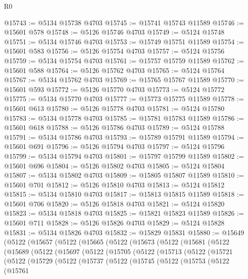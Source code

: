\begin{lexlean}{R0}
\begin{coremodule}
@15743 := @5134 @15738 @4703
@15745 := @15741 @15743 @11589
@15746 := @15601 @578
@15748 := @5126 @15746 @4703
@15749 := @5124 @15748
@15751 := @5134 @15746 @4703
@15753 := @15749 @15751 @11589
@15754 := @15601 @583
@15756 := @5126 @15754 @4703
@15757 := @5124 @15756
@15759 := @5134 @15754 @4703
@15761 := @15757 @15759 @11589
@15762 := @15601 @588
@15764 := @5126 @15762 @4703
@15765 := @5124 @15764
@15767 := @5134 @15762 @4703
@15769 := @15765 @15767 @11589
@15770 := @15601 @593
@15772 := @5126 @15770 @4703
@15773 := @5124 @15772
@15775 := @5134 @15770 @4703
@15777 := @15773 @15775 @11589
@15778 := @15601 @613
@15780 := @5126 @15778 @4703
@15781 := @5124 @15780
@15783 := @5134 @15778 @4703
@15785 := @15781 @15783 @11589
@15786 := @15601 @618
@15788 := @5126 @15786 @4703
@15789 := @5124 @15788
@15791 := @5134 @15786 @4703
@15793 := @15789 @15791 @11589
@15794 := @15601 @691
@15796 := @5126 @15794 @4703
@15797 := @5124 @15796
@15799 := @5134 @15794 @4703
@15801 := @15797 @15799 @11589
@15802 := @15601 @696
@15804 := @5126 @15802 @4703
@15805 := @5124 @15804
@15807 := @5134 @15802 @4703
@15809 := @15805 @15807 @11589
@15810 := @15601 @701
@15812 := @5126 @15810 @4703
@15813 := @5124 @15812
@15815 := @5134 @15810 @4703
@15817 := @15813 @15815 @11589
@15818 := @15601 @706
@15820 := @5126 @15818 @4703
@15821 := @5124 @15820
@15823 := @5134 @15818 @4703
@15825 := @15821 @15823 @11589
@15826 := @15601 @711
@15828 := @5126 @15826 @4703
@15829 := @5124 @15828
@15831 := @5134 @15826 @4703
@15832 := @15829 @15831
@15880 := @15649
    (@5122
      (@15657
        (@5122
          (@15665
            (@5122
              (@15673
                (@5122
                  (@15681
                    (@5122
                      (@15689
                        (@5122
                          (@15697
                            (@5122
                              (@15705
                                (@5122
                                  (@15713
                                    (@5122
                                      (@15721
                                        (@5122
                                          (@15729
                                            (@5122
                                              (@15737
                                                (@5122
                                                  (@15745
                                                    (@5122
                                                      (@15753
                                                        (@5122
                                                          (@15761

\end{coremodule}
\end{lexlean}
